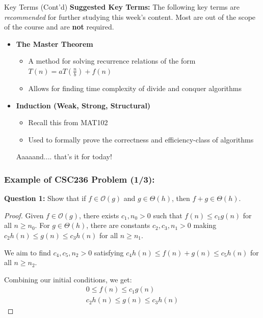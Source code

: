 \documentclass[hyperref={colorlinks,citecolor=blue,linkcolor=blue,urlcolor=blue}, aspectratio=1610]{beamer}
\begin{document}
\begin{frame}{Key Terms (Cont'd)}
  \textbf{Suggested Key Terms:} The following key terms are \textit{recommended} for further studying this week's content. Most are out of the scope of the course and are \textbf{not} required. 
  \begin{itemize} 
    \item \textbf{The Master Theorem}
    \begin{itemize}
      \item A method for solving recurrence relations of the form $T(n) = aT\left(\frac{n}{b}\right) + f(n)$
      \item Allows for finding time complexity of divide and conquer algorithms
    \end{itemize}
    \item \textbf{Induction (Weak, Strong, Structural)}
    \begin{itemize}
      \item Recall this from MAT102
      \item Used to formally prove the correctness and efficiency-class of algorithms
    \end{itemize}
    Aaaaand.... that's it for today! 
  \end{itemize}
\end{frame}

\begin{frame}
  \frametitle{Example of CSC236 Problem (1/3):}
  \textbf{Question 1:} Show that if $f \in \mathcal{O}(g)$ and $g \in \Theta(h)$, then $f + g \in \Theta(h)$.

  \begin{proof}
    Given $f \in \mathcal{O}(g)$, there exists $c_1, n_0 > 0$ such that $f(n) \leq c_1g(n)$ for all $n \geq n_0$. For $g \in \Theta(h)$, there are constants $c_2, c_3, n_1 > 0$ making $c_2h(n) \leq g(n) \leq c_3h(n)$ for all $n \geq n_1$.

    We aim to find $c_4, c_5, n_2 > 0$ satisfying $c_4h(n) \leq f(n) + g(n) \leq c_5h(n)$ for all $n \geq n_2$.

    Combining our initial conditions, we get:
    \begin{align*}
        0 \leq f(n) \leq c_1g(n) \\
        c_2h(n) \leq g(n) \leq c_3h(n)
    \end{align*}
  \end{proof}
\end{frame}
\end{document}
